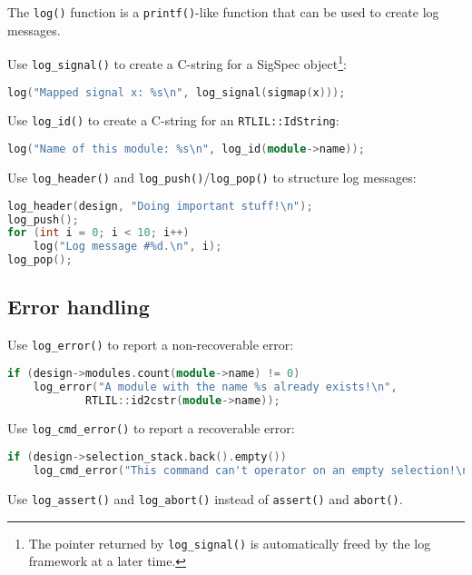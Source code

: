 \begin{frame}[t, fragile]{\subsecname}
The {\tt log()} function is a {\tt printf()}-like function that can be used to create log messages.

\medskip
Use {\tt log\_signal()} to create a C-string for a SigSpec object\footnote[frame]{The pointer returned
by {\tt log\_signal()} is automatically freed by the log framework at a later time.}:
\begin{lstlisting}[xleftmargin=1cm, basicstyle=\ttfamily\fontsize{8pt}{10pt}\selectfont, language=C++]
log("Mapped signal x: %s\n", log_signal(sigmap(x)));
\end{lstlisting}

\medskip
Use {\tt log\_id()} to create a C-string for an {\tt RTLIL::IdString}:
\begin{lstlisting}[xleftmargin=1cm, basicstyle=\ttfamily\fontsize{8pt}{10pt}\selectfont, language=C++]
log("Name of this module: %s\n", log_id(module->name));
\end{lstlisting}

\medskip
Use {\tt log\_header()} and {\tt log\_push()}/{\tt log\_pop()} to structure log messages:
\begin{lstlisting}[xleftmargin=1cm, basicstyle=\ttfamily\fontsize{8pt}{10pt}\selectfont, language=C++]
log_header(design, "Doing important stuff!\n");
log_push();
for (int i = 0; i < 10; i++)
    log("Log message #%d.\n", i);
log_pop();
\end{lstlisting}
\end{frame}


\subsection{Error handling}

\begin{frame}[t, fragile]{\subsecname}
Use {\tt log\_error()} to report a non-recoverable error:

\medskip
\begin{lstlisting}[xleftmargin=1cm, basicstyle=\ttfamily\fontsize{8pt}{10pt}\selectfont, language=C++]
if (design->modules.count(module->name) != 0)
    log_error("A module with the name %s already exists!\n",
            RTLIL::id2cstr(module->name));
\end{lstlisting}

\bigskip
Use {\tt log\_cmd\_error()} to report a recoverable error:
\begin{lstlisting}[xleftmargin=1cm, basicstyle=\ttfamily\fontsize{8pt}{10pt}\selectfont, language=C++]
if (design->selection_stack.back().empty())
    log_cmd_error("This command can't operator on an empty selection!\n");
\end{lstlisting}

\bigskip
Use {\tt log\_assert()} and {\tt log\_abort()} instead of {\tt assert()} and {\tt abort()}.
\end{frame}

